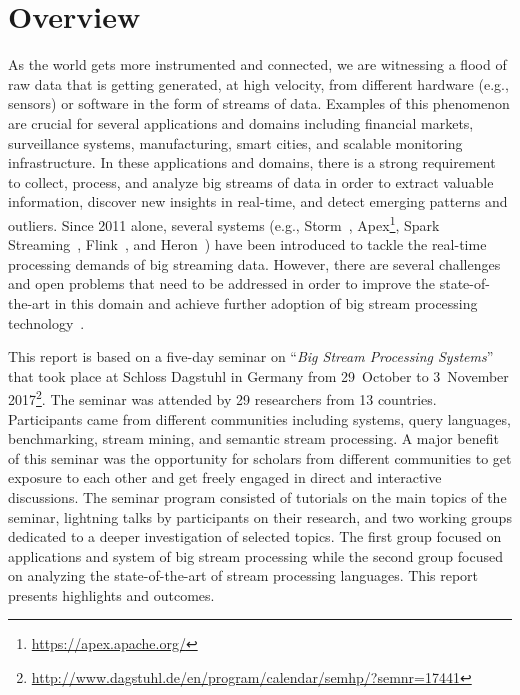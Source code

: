 \section{Overview}\label{sec:overview}

As the world gets more instrumented and connected, we are witnessing a
flood of raw data that is getting generated, at high velocity,
from different hardware (e.g., sensors) or software in the form of
streams of data. Examples of this phenomenon are crucial for several
applications and domains including financial markets, surveillance
systems, manufacturing, smart cities, and scalable monitoring
infrastructure. In these applications and domains, there is a strong
requirement to collect, process, and analyze big streams of data in
order to extract valuable information, discover new insights in
real-time, and detect emerging patterns and outliers. Since 2011
alone, several systems (e.g.,
\textsf{\small Storm}~\cite{toshniwal_et_al_2014},
\textsf{\small Apex}\footnote{\url{https://apex.apache.org/}},
\textsf{\small Spark Streaming}~\cite{zaharia_et_al_2013},
\textsf{\small Flink}~\cite{carbone_et_al_2015}, and
\textsf{\small Heron}~\cite{kulkarni_et_al_2015}) have
been introduced to tackle the real-time processing demands of big streaming data. However, there are several challenges and open problems that need to be addressed in order to improve the state-of-the-art in this domain and achieve further adoption of big stream processing technology~\cite{sakr2016big}.

This report is based on a five-day seminar on ``\emph{Big Stream
  Processing Systems}'' that took place at Schloss Dagstuhl in Germany
from 29~October to 3~November 2017\footnote{\url{http://www.dagstuhl.de/en/program/calendar/semhp/?semnr=17441}}. The seminar was attended by 29 researchers from  13 countries. Participants came from different communities including systems, query languages, benchmarking, stream mining, and semantic stream processing. A major benefit of this seminar was the opportunity for scholars from different communities to get exposure to each other and get freely engaged in direct and interactive discussions. The seminar program consisted of tutorials on the main topics of the seminar, lightning talks by participants on their research, and two working groups dedicated to a deeper investigation of selected topics. The first group focused on applications and system of big stream processing while the second group focused on analyzing the state-of-the-art of stream processing languages. This report presents  highlights and outcomes.
